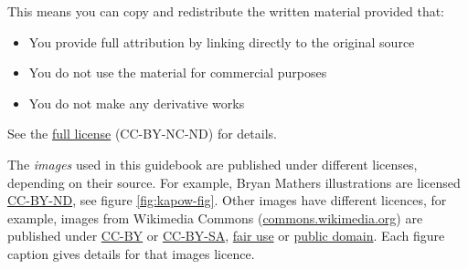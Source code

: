 \documentclass[
]{book}
\providecommand{\tightlist}{%
  \setlength{\itemsep}{0pt}\setlength{\parskip}{0pt}}
\begin{document}
This means you can copy and redistribute the written material provided that:

\begin{itemize}
\tightlist
\item
  You provide full attribution by linking directly to the original source
\item
  You do not use the material for commercial purposes
\item
  You do not make any derivative works
\end{itemize}

See the \href{https://creativecommons.org/licenses/by-nc-nd/3.0/}{full license} (CC-BY-NC-ND) for details.

The \emph{images} used in this guidebook are published under different licenses, depending on their source. For example, Bryan Mathers illustrations are licensed \href{https://creativecommons.org/licenses/by-nd/4.0/}{CC-BY-ND}, see figure \ref{fig:kapow-fig}. Other images have different licences, for example, images from Wikimedia Commons (\href{https://commons.wikimedia.org/}{commons.wikimedia.org}) are published under \href{https://creativecommons.org/licenses/by/2.0/}{CC-BY} or \href{https://creativecommons.org/licenses/by-sa/2.0/}{CC-BY-SA}, \href{https://en.wikipedia.org/wiki/Fair_use}{fair use} or \href{https://en.wikipedia.org/wiki/Public_domain}{public domain}. Each figure caption gives details for that images licence.
\end{document}
